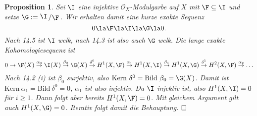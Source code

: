 \documentclass[11pt]{book}
\newtheorem{proposition}[theorem]{Proposition}
\theoremstyle{nonumberbreak}
\newenvironment{pr}[1][]{\ifthenelse{\equal{#1}{}}{\proof}{\proof[#1]}\rm}{\endproof}
\newcommand{\bild}{\mathrm{Bild}\ }
\newcommand{\kernel}{\mathrm{Kern}\ }
\newcommand{\slant}[2]{{\raisebox{.1em}{$#1$}\left/\raisebox{-.1em}{$#2$}\right.}}
\begin{document}
\begin{spacing}{1.4}
\begin{proposition}
\begin{pr}
Sei $\I$ eine injektive $\mathcal{O}_X$-Modulgarbe auf $X$ mit $\F \subseteq \I$ und setze $\G:= \slant{\I}{\F}$. Wir erhalten damit eine kurze exakte Sequenz
$$0 \la \F \la \I \la \G \la 0.$$
Nach 14.5 ist $\I$ welk, nach 14.3 ist also auch $\G$ welk. Die lange exakte Kohomologiesequenz ist 
$$0 \rightarrow \F(X) \overset{\alpha_0}{\rightarrow} \I(X) \overset{\beta_0}{\rightarrow} \G(X) \overset{\delta^{0}}{\rightarrow} H^{1}(X, \F) \overset{\alpha_1}{\rightarrow} H^{1}(X, \I) \overset{\beta_1}{\rightarrow} H^{1}(X, \G) \overset{\delta^{1}}{\rightarrow} H^{2}(X, \F) \overset{\alpha_2}{\rightarrow} \ldots$$
Nach 14.2 (i) ist $\beta_0$ surjektiv, also $\kernel \delta^{0} = \bild \beta_0 = \G(X)$. Damit ist $\kernel \alpha_1 = \bild \delta^{0} = 0$, $\alpha_1$ ist also injektiv. Da $\I$ injektiv ist, also $H^{1}(X, \I) = 0$ für $i \geqslant 1$. Dann folgt aber bereits $H^{1}(X, \F) = 0$. Mit gleichem Argument gilt auch $H^{1}(X, \G) = 0$. Iterativ folgt damit die Behauptung. $\hfill \Box$

\end{pr}

\end{proposition}



\end{spacing}
\end{document}
